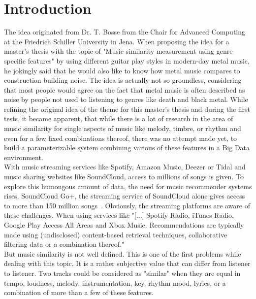 

\mainmatter %

\chapter{Introduction}\label{intro}

The idea originated from Dr. T. Bosse from the Chair for Advanced Computing at the Friedrich Schiller University in Jena. When proposing the idea for a master's thesis with the topic of "Music similarity measurement using genre-specific features" by using different guitar play styles in modern-day metal music, he jokingly said that he would also like to know how metal music compares to construction building noise. The idea is actually not so groundless, considering that most people would agree on the fact that metal music is often described as noise by people not used to listening to genres like death and black metal.
While refining the original idea of the theme for this master's thesis and during the first tests, it became apparent, that while there is a lot of research in the area of music similarity for single aspects of music like melody, timbre, or rhythm and even for a few fixed combinations thereof, there was no attempt made yet, to build a parameterizable system combining various of these features in a Big Data environment.\\
With music streaming services like Spotify, Amazon Music, Deezer or Tidal and music sharing websites like SoundCloud, access to millions of songs is given. To explore this humongous amount of data, the need for music recommender systems rises. SoundCloud Go+, the streaming service of SoundCloud alone gives access to more than 150 million songs~\cite{soundcloudgo}. 
Obviously, the streaming platforms are aware of these challenges. When using services like "[...] Spotify Radio, iTunes Radio, Google Play Access All Areas and Xbox Music. Recommendations are typically made using (undisclosed) content-based retrieval techniques, collaborative filtering data or a combination thereof."~\cite[p. 9]{knees1}\\
But music similarity is not well defined. This is one of the first problems while dealing with this topic. It is a rather subjective value that can differ from listener to listener. Two tracks could be considered as "similar" when they are equal in tempo, loudness, melody, instrumentation, key, rhythm mood, lyrics, or a combination of more than a few of these features.\\
\ \\
